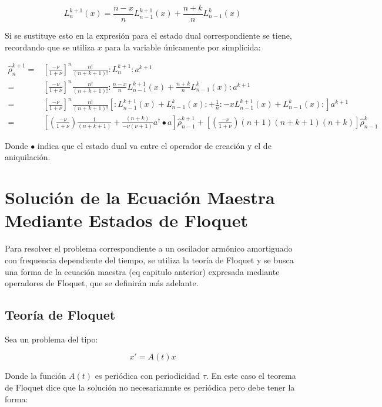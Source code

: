\documentclass[a4paper,10pt]{report}
\begin{document}
\begin{equation}
L_n^{k+1}(x) = \frac{n-x}{n}L_{n-1}^{k+1}(x) + \frac{n+k}{n}L_{n-1}^{k}(x)
\end{equation}

Si se sustituye esto en la expresión para el estado dual correspondiente se tiene, recordando que se utiliza $x$ para la variable únicamente por simplicida:

\begin{align}
\hat{\rho}_n ^{k+1} =& [\frac{-\nu}{1+\nu}]^n \frac{n!}{(n+k+1)!} :L_n^{k+1}:a^{k+1}\\
=&[\frac{-\nu}{1+\nu}]^n\frac{n!}{(n+k+1)!} :\frac{n-x}{n}L_{n-1}^{k+1}(x) + \frac{n+k}{n}L_{n-1}^{k}(x):a^{k+1}\\
=&[\frac{-\nu}{1+\nu}]^n\frac{n!}{(n+k+1)!}[:L_{n-1}^{k+1}(x)+L_{n-1}^{k}(x):+\frac{1}{n}:-xL_{n-1}^{k+1}(x)+L_{n-1}^{k}(x):]a^{k+1}\\
=&[(\frac{-\nu}{1+\nu})\frac{1}{(n+k+1)}+ \frac{(n+k)}{-\nu(\nu+1)}a^\dagger \bullet a]\hat{\rho}_{n-1} ^{k+1} + [(\frac{-\nu}{1+\nu}) (n+1)(n+k+1)(n+k)]\hat{\rho}_{n-1} ^{k}
\end{align}

Donde $\bullet$ indica que el estado dual va entre el operador de creación y el de aniquilación.


\chapter{Solución de la Ecuación Maestra Mediante Estados de Floquet}

Para resolver el problema correspondiente a un oscilador armónico amortiguado con frequencia dependiente del tiempo, se utiliza la teoría de Floquet \cite{WardFT}y se busca una forma de la ecuación maestra (eq capitulo anterior) expresada mediante operadores de Floquet, que se definirán más adelante.

\section{Teoría de Floquet}

Sea un problema del tipo:

\begin{equation}
x' = A(t)x
\end{equation}

Donde la función $A(t)$ es periódica con periodicidad $\tau$. En este caso el teorema de Floquet dice que la solución no necesariamnte es periódica pero debe tener la forma:
\end{document}
